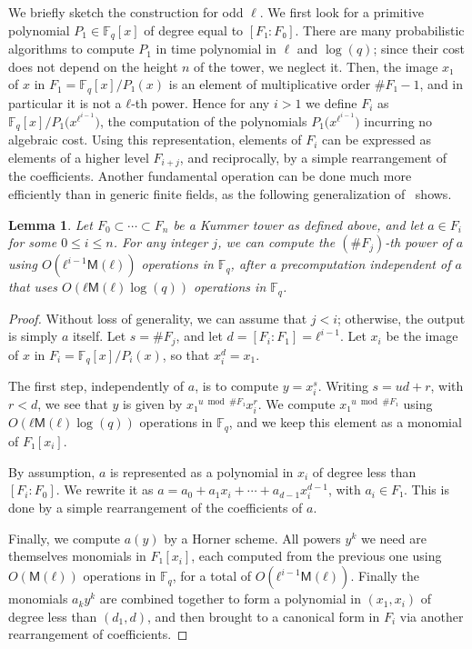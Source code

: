 \documentclass{lms}
\newtheorem{lem}[thm]{Lemma}
\def\cout#1{\mathsf{#1}}
\newcommand{\F}{\mathbb{F}}
\newcommand{\MM}{\cout{M}}
\begin{document}
We briefly sketch the construction for odd $\ell$. We first look for a
primitive polynomial $P_1∈\F_q[x]$ of degree equal to $[F₁:F₀]$. There
are many probabilistic algorithms to compute $P_1$ in time polynomial
in $\ell$ and $\log(q)$; since their cost does not depend on the height
$n$ of the tower, we neglect it. Then, the image $x₁$ of $x$ in
$F_1=\F_q[x]/P₁(x)$ is an element of multiplicative order $\#F₁-1$,
and in particular it is not a $ℓ$-th power. Hence for any $i>1$ we
define $F_i$ as $\F_q[x]/P_1\bigl(x^{ℓ^{i-1}}\bigr)$, the computation
of the polynomials $P_1\bigl(x^{ℓ^{i-1}}\bigr)$ incurring no algebraic
cost. Using this representation, elements of $F_i$ can be expressed as
elements of a higher level $F_{i+j}$, and reciprocally, by a simple
rearrangement of the coefficients. Another fundamental operation can
be done much more efficiently than in generic finite fields, as the
following generalization of~\cite[\S2.3]{DoSc12} shows.

\begin{lem}\label{lemma:frob-ell}
  Let $F_0⊂\cdots⊂F_n$ be a Kummer tower as defined above, and let
  $a∈F_i$ for some $0≤i≤n$. For any integer $j$, we can compute the
  $(\#F_j)$-th power of $a$ using $O(ℓ^{i-1}\MM(ℓ))$ operations in
  $\F_q$, after a precomputation independent of $a$ that uses
  $O(ℓ\MM(ℓ)\log(q))$ operations in $\F_q$.
\end{lem}
\begin{proof}
  Without loss of generality, we can assume that $j<i$; otherwise, the
  output is simply $a$ itself.  Let $s=\#F_j$, and let
  $d=[F_i:F_1]=ℓ^{i-1}$. Let $x_i$ be the image of $x$ in
  $F_i=\F_q[x]/P_i(x)$, so that $x_i^d=x_1$.

  The first step, independently of $a$, is to compute
  $y=x_i^s$. Writing $s = ud + r$, with $r<d$, we see that $y$ is
  given by $x₁^{u \bmod \#F₁}x_i^r$. We compute $x₁^{u\bmod\#F₁}$
  using $O(ℓ\MM(ℓ)\log(q))$ operations in $\F_q$, and we keep this
  element as a monomial of $F₁[x_i]$.

  By assumption, $a$ is represented as a polynomial in $x_i$ of degree
  less than $[F_i:F_0]$. We rewrite it as
  $a =a_0 + a_1 x_i + \cdots + a_{d-1} x_i^{d-1}$, with $a_i∈F₁$. This
  is done by a simple rearrangement of the coefficients of $a$.

  Finally, we compute $a(y)$ by a Horner scheme. All powers $y^k$ we
  need are themselves monomials in $F₁[x_i]$, each computed from the
  previous one using $O(\MM(ℓ))$ operations in $\F_q$, for a total of
  $O(ℓ^{i-1}\MM(ℓ))$. Finally the monomials $a_ky^k$ are combined
  together to form a polynomial in $(x_1,x_i)$ of degree less than
  $(d_1,d)$, and then brought to a canonical form in $F_i$ via another
  rearrangement of coefficients.
\end{proof}
\end{document}
